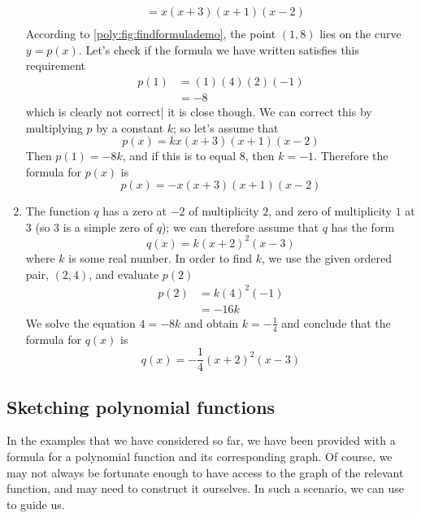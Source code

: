 \begin{pccexample}
\begin{pccsolution}
\begin{enumerate}
\begin{align*}
				     & =x(x+3)(x+1)(x-2)     \\     
			\end{align*}
			According to \cref{poly:fig:findformulademo}, the point $(1,8)$ lies 
			on the curve $y=p(x)$.
			Let's check if the formula we have written satisfies this requirement
			\begin{align*}
				p(1) & = (1)(4)(2)(-1) \\ 
				     & = -8            
			\end{align*}
			which is clearly not correct| it is close though. We can correct this by 
			multiplying $p$ by a constant $k$; so let's assume that
			\[
				p(x)=kx(x+3)(x+1)(x-2)
			\]
			Then $p(1)=-8k$, and if this is to equal $8$, then $k=-1$. Therefore
			the formula for $p(x)$ is
			\[
				p(x)=-x(x+3)(x+1)(x-2)
			\]
			\item The function $q$ has a zero at $-2$ of multiplicity $2$, and zero of 
			multiplicity $1$ at $3$ (so $3$ is a simple zero of $q$); we can therefore assume that $q$ has the form
			\[
				q(x)=k(x+2)^2(x-3)
			\]
			where $k$ is some real number. In order to find $k$, we use the given ordered pair, $(2,4)$, and
			evaluate $p(2)$
			\begin{align*}
				p(2) & =k(4)^2(-1) \\ 
				     & =-16k       
			\end{align*}
			We solve the equation $4=-8k$ and obtain $k=-\frac{1}{4}$ and conclude that the 
			formula for $q(x)$ is
			\[
				q(x)=-\frac{1}{4}(x+2)^2(x-3)
			\]
		\end{enumerate}
	\end{pccsolution}
\end{pccexample}


\subsection*{Sketching polynomial functions}
In the examples that we have considered so far, we have been provided 
with a formula for a polynomial function and its corresponding graph. Of course, we may not always
be fortunate enough to have access to the graph of the relevant function, 
and may need to construct it ourselves. In such a scenario, we can 
use  to guide us.

